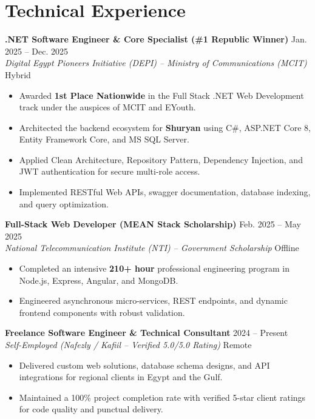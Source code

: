 \documentclass[11pt,a4paper]{article}
\begin{document}
\section{Technical Experience}

\textbf{.NET Software Engineer \& Core Specialist (\#1 Republic Winner)} \hfill Jan. 2025 -- Dec. 2025 \\
\textit{Digital Egypt Pioneers Initiative (DEPI) -- Ministry of Communications (MCIT)} \hfill Hybrid
\begin{itemize}[leftmargin=*, nosep]
    \item Awarded \textbf{1st Place Nationwide} in the Full Stack .NET Web Development track under the auspices of MCIT and EYouth.
    \item Architected the backend ecosystem for \textbf{Shuryan} using C\#, ASP.NET Core 8, Entity Framework Core, and MS SQL Server.
    \item Applied Clean Architecture, Repository Pattern, Dependency Injection, and JWT authentication for secure multi-role access.
    \item Implemented RESTful Web APIs, swagger documentation, database indexing, and query optimization.
\end{itemize}

\textbf{Full-Stack Web Developer (MEAN Stack Scholarship)} \hfill Feb. 2025 -- May 2025 \\
\textit{National Telecommunication Institute (NTI) -- Government Scholarship} \hfill Offline
\begin{itemize}[leftmargin=*, nosep]
    \item Completed an intensive \textbf{210+ hour} professional engineering program in Node.js, Express, Angular, and MongoDB.
    \item Engineered asynchronous micro-services, REST endpoints, and dynamic frontend components with robust validation.
\end{itemize}

\textbf{Freelance Software Engineer \& Technical Consultant} \hfill 2024 -- Present \\
\textit{Self-Employed (Nafezly / Kafiil -- Verified 5.0/5.0 Rating)} \hfill Remote
\begin{itemize}[leftmargin=*, nosep]
    \item Delivered custom web solutions, database schema designs, and API integrations for regional clients in Egypt and the Gulf.
    \item Maintained a 100\% project completion rate with verified 5-star client ratings for code quality and punctual delivery.
\end{itemize}
\end{document}
